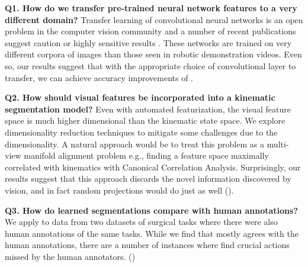\vspace{0.25em}

\noindent \textbf{Q1. How do we transfer pre-trained neural network features to a very different domain? } Transfer learning of convolutional neural networks is an open problem in the computer vision community and a number of recent publications suggest caution or highly sensitive results \cite{oquab2014learning}.  These networks are trained on very different corpora of images than those seen in robotic demonstration videos. Even so, our results suggest that with the appropriate choice of convolutional layer to transfer, we can achieve accuracy improvements of .

\vspace{0.25em}

\noindent \textbf{Q2. How should visual features be incorporated into a kinematic segmentation model? } Even with automated featurization, the visual feature space is much higher dimensional than the kinematic state space. We explore dimensionality reduction techniques to mitigate some challenges due to the dimensionality. A natural approach would be to treat this problem as a multi-view manifold alignment problem e.g., finding a feature space maximally correlated with kinematics with Canonical Correlation Analysis. Surprisingly, our results suggest that this approach discards the novel information discovered by vision, and in fact random projections would do just as well ().

\vspace{0.25em}

\noindent \textbf{Q3. How do learned segmentations compare with human annotations? } We apply \sys to data from two datasets of surgical tasks \cite{gao2014jigsaws} where there were also human annotations of the same tasks.
While we find that \sys mostly agrees with the human annotations, there are a number of instances where \sys find crucial actions missed by the human annotators. () 

